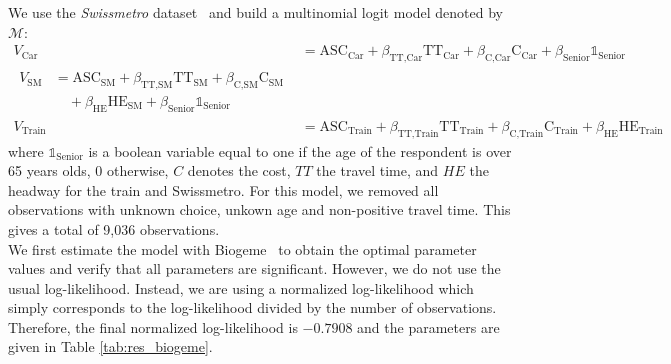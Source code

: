 \documentclass[conference]{IEEEtran}
\begin{document}
We use the {\it Swissmetro} dataset~\cite{bierlaire_acceptance_2001} and build a multinomial logit model denoted by $\mathcal{M}$:
\begin{align}
\label{eq:model}
V_{\text{Car}} &= \text{ASC}_{\text{Car}} + \beta_{\text{TT,Car}} \text{TT}_{\text{Car}} + \beta_{\text{C,Car}} \text{C}_{\text{Car}} + \beta_{\text{Senior}}\mathbb{1}_{\text{Senior}} \nonumber \\
\begin{split}
V_{\text{SM}} &= \text{ASC}_{\text{SM}} + \beta_{\text{TT,SM}} \text{TT}_{\text{SM}} + \beta_{\text{C,SM}} \text{C}_{\text{SM}} \\
& \quad + \beta_{\text{HE}} \text{HE}_{\text{SM}} + \beta_{\text{Senior}}\mathbb{1}_{\text{Senior}}
\end{split} \\
V_{\text{Train}} &= \text{ASC}_{\text{Train}} + \beta_{\text{TT,Train}} \text{TT}_{\text{Train}} + \beta_{\text{C,Train}} \text{C}_{\text{Train}} + \beta_{\text{HE}} \text{HE}_{\text{Train}} \nonumber
\end{align}
where $\mathbb{1}_{\text{Senior}}$ is a boolean variable equal to one if the age of the respondent is over 65 years olds, 0 otherwise, $C$ denotes the cost, $TT$ the travel time, and $HE$ the headway for the train and Swissmetro. For this model, we removed all observations with unknown choice, unkown age and non-positive travel time. This gives a total of 9,036 observations.\\
 
We first estimate the model with Biogeme~\cite{bierlaire_biogeme:_2003} to obtain the optimal parameter values and verify that all parameters are significant. However, we do not use the usual log-likelihood. Instead, we are using a normalized log-likelihood which simply corresponds to the log-likelihood divided by the number of observations. Therefore, the final normalized log-likelihood is $-0.7908$ and the parameters are given in Table \ref{tab:res_biogeme}.\\
\end{document}
